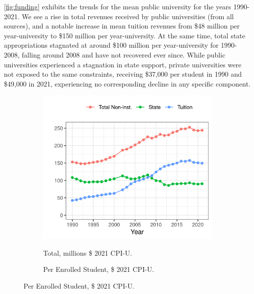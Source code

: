 \autoref{fig:funding} exhibits the trends for the mean public university for the years 1990-2021.
We see a rise in total revenues received by public universities (from all sources), and a notable increase in mean tuition revenues from \$48 million per year-university to \$150 million per year-university.
At the same time, total state appropriations stagnated at around \$100 million per year-university for 1990-2008, falling around 2008 and have not recovered ever since.
While public universities experienced a stagnation in state support, private universities were not exposed to the same constraints, receiving \$37,000 per student in 1990 and \$49,000 in 2021, experiencing no corresponding decline in any specific component.

\begin{figure}[h!]
    \centering
    \singlespacing
    \caption{Mean Total Revenues among Public Universities, by Year.}
    \begin{subfigure}[b]{0.495\textwidth}
        \centering
        \caption{Total, millions \$ 2021 CPI-U.}
        \includegraphics[width=\textwidth]{figures/mean-funding-total.png}
        \label{fig:mean-funding-total}
    \end{subfigure}
    \begin{subfigure}[b]{0.495\textwidth}
        \centering
        \caption{Per Enrolled Student, \$ 2021 CPI-U.}

\end{subfigure}
\end{figure}
